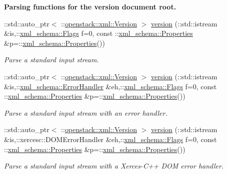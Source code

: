 \begin{Indent}{\bf Parsing functions for the version document root.}
\begin{DoxyCompactItemize}
::std::auto\_\-ptr$<$ ::\hyperlink{classopenstack_1_1xml_1_1Version}{openstack::xml::Version} $>$ \hyperlink{namespaceopenstack_1_1xml_a7dc9fa453536cfa9b4f5fc1bf224d43f}{version} (::std::istream \&is,::\hyperlink{namespacexml__schema_affb4c227cbd9aa7453dd1dc5a1401943}{xml\_\-schema::Flags} f=0, const ::\hyperlink{namespacexml__schema_ad27ce19a7ee1d3b1064092648898f64c}{xml\_\-schema::Properties} \&p=::\hyperlink{namespacexml__schema_ad27ce19a7ee1d3b1064092648898f64c}{xml\_\-schema::Properties}())
\begin{DoxyCompactList}\small\item\em Parse a standard input stream. \item\end{DoxyCompactList}\item 
::std::auto\_\-ptr$<$ ::\hyperlink{classopenstack_1_1xml_1_1Version}{openstack::xml::Version} $>$ \hyperlink{namespaceopenstack_1_1xml_ab0c8e0a0f182a6d57bd1c739d5e08c67}{version} (::std::istream \&is,::\hyperlink{namespacexml__schema_ab1c9361bfd3b404eaabf0c31eded79dc}{xml\_\-schema::ErrorHandler} \&eh,::\hyperlink{namespacexml__schema_affb4c227cbd9aa7453dd1dc5a1401943}{xml\_\-schema::Flags} f=0, const ::\hyperlink{namespacexml__schema_ad27ce19a7ee1d3b1064092648898f64c}{xml\_\-schema::Properties} \&p=::\hyperlink{namespacexml__schema_ad27ce19a7ee1d3b1064092648898f64c}{xml\_\-schema::Properties}())
\begin{DoxyCompactList}\small\item\em Parse a standard input stream with an error handler. \item\end{DoxyCompactList}\item 
::std::auto\_\-ptr$<$ ::\hyperlink{classopenstack_1_1xml_1_1Version}{openstack::xml::Version} $>$ \hyperlink{namespaceopenstack_1_1xml_ac6fdb66f91ee005df19f0ce88f645022}{version} (::std::istream \&is,::xercesc::DOMErrorHandler \&eh,::\hyperlink{namespacexml__schema_affb4c227cbd9aa7453dd1dc5a1401943}{xml\_\-schema::Flags} f=0, const ::\hyperlink{namespacexml__schema_ad27ce19a7ee1d3b1064092648898f64c}{xml\_\-schema::Properties} \&p=::\hyperlink{namespacexml__schema_ad27ce19a7ee1d3b1064092648898f64c}{xml\_\-schema::Properties}())
\begin{DoxyCompactList}\small\item\em Parse a standard input stream with a Xerces-\/C++ DOM error handler. \item\end{DoxyCompactList}\item 

\end{DoxyCompactItemize}
\end{Indent}
